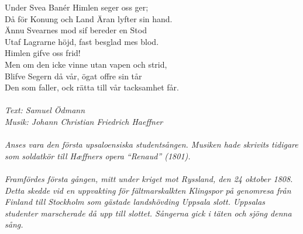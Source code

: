 \vspace{10pt}
Under Svea Banér Himlen seger oss ger;\\
Då för Konung och Land Äran lyfter sin hand.\\
Ännu Svearnes mod sif bereder en Stod\\
Utaf Lagrarne höjd, fast besglad mes blod.\\
Himlen gifve oss frid!\\
Men om den icke vinne utan vapen och strid,\\
Blifve Segern då vår, ögat offre sin tår\\
Den som faller, ock rätta till vår tacksamhet får.\\
\\
{\footnotesize\textit{Text: Samuel Ödmann\\
Musik: Johann Christian Friedrich Haeffner\\
\\
Anses vara den första upsaloensiska studentsången. Musiken hade skrivits tidigare som soldatkör till Hæffners opera “Renaud” (1801).\\
\\
Framfördes första gången, mitt under kriget mot Ryssland, den 24
oktober 1808. Detta skedde vid en uppvakting för fältmarskalkten
Klingspor på genomresa från Finland till Stockholm som gästade
landshövding Uppsala slott.  Uppsalas studenter marscherade då upp
till slottet. Sångerna gick i täten och sjöng denna sång.
}}
\clearpage
